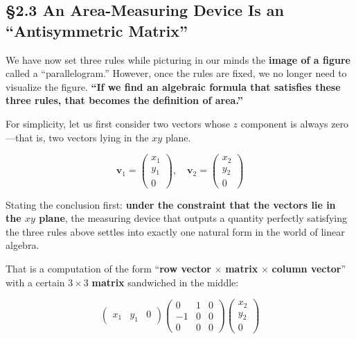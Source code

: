 \documentclass[a4paper,12pt,openany]{book}
\begin{document}
\par\vspace{0.35em}\par

\hypertarget{an-area-measuring-device-is-an-antisymmetric-matrix}{%
\subsection{§2.3 An Area-Measuring Device Is an ``Antisymmetric
Matrix''}\label{an-area-measuring-device-is-an-antisymmetric-matrix}}

We have now set three rules while picturing in our minds the
\textbf{image of a figure} called a ``parallelogram.'' However, once the
rules are fixed, we no longer need to visualize the figure.
\textbf{“If we find an algebraic formula that satisfies these three rules, that becomes the definition of area.”}

For simplicity, let us first consider two vectors whose \(z\) component
is always zero—that is, two vectors lying in the \(xy\) plane.

\[
\mathbf{v}_1 = \begin{pmatrix} x_1 \\ y_1 \\ 0 \end{pmatrix}, \quad \mathbf{v}_2 = \begin{pmatrix} x_2 \\ y_2 \\ 0 \end{pmatrix}
\]

Stating the conclusion first:
\textbf{under the constraint that the vectors lie in the $xy$ plane},
the measuring device that outputs a quantity perfectly satisfying the
three rules above settles into exactly one natural form in the world of
linear algebra.

That is a computation of the form ``\textbf{row vector} \(\times\)
\textbf{matrix} \(\times\) \textbf{column vector}'' with a certain
\(3 \times 3\) \textbf{matrix} sandwiched in the middle:

\[
\begin{pmatrix} x_1 & y_1 & 0 \end{pmatrix}
\begin{pmatrix}
  0 & 1 & 0 \\
  -1 & 0 & 0 \\
  0 & 0 & 0
\end{pmatrix}
\begin{pmatrix} x_2 \\ y_2 \\ 0 \end{pmatrix}
\]
\end{document}

